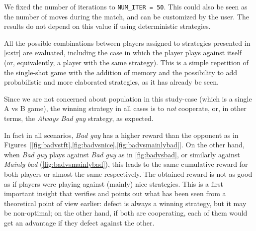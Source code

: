 \documentclass[journal,a4paper,10pt,twoside]{IEEEtran} %
\begin{document}
We fixed the number of iterations to \texttt{NUM\_ITER = 50}. This could also be seen as the number of moves during the match, and can be customized by the user. The results do not depend on this value if using deterministic strategies.

All the possible combinations between players assigned to strategies presented in \autoref{s:str} are evaluated, including the case in which the player plays against itself (or, equivalently, a player with the same strategy).
This is a simple repetition of the single-shot game with the addition of memory and the possibility to add probabilistic and more elaborated strategies, as it has already be seen.

Since we are not concerned about population in this study-case (which is a single A vs B game), the winning strategy in all cases is to \textit{not} cooperate, or, in other terms, the \textit{Always Bad guy} strategy, as expected.

In fact in all scenarios, \textit{Bad guy} has a higher reward than the opponent as in Figures~[\ref{fig:badvstft},\ref{fig:badvsnice},\ref{fig:badvsmainlybad}]. 
On the other hand, when \textit{Bad guy} plays against \textit{Bad guy} as in \autoref{fig:badvsbad}, or similarly against \textit{Mainly bad} (\autoref{fig:badvsmainlybad}), this leads to the same cumulative reward for both players or almost the same respectively. The obtained reward is not as good as if players were playing against (mainly) nice strategies. This is a first important insight that verifies and points out what has been seen from a theoretical point of view earlier: defect is always a winning strategy, but it may be non-optimal; on the other hand, if both are cooperating, each of them would get an advantage if they defect against the other.
\end{document}
